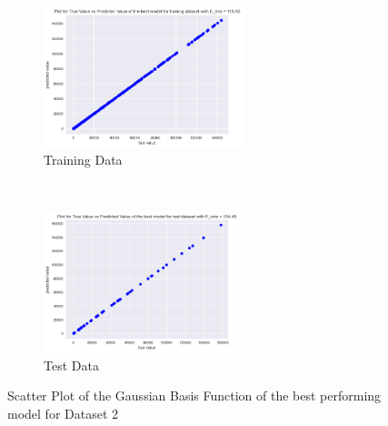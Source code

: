 \begin{figure}[h]
    \centering
    \begin{subfigure}[t]{0.50\textwidth}
        \centering
        \includegraphics[height=1.6in]{Task3_new_images/batch500_tr.png}
        \caption{Training Data}
    \end{subfigure}%
    ~ 
    \begin{subfigure}[t]{0.50\textwidth}
        \centering
        \includegraphics[height=1.6in]{Task3_new_images/batch500_test.png}
        \caption{Test Data }
    \end{subfigure}%
    \caption{Scatter Plot of the Gaussian Basis Function of the best performing model for Dataset 2}
    \label{fig:17}
\end{figure}




